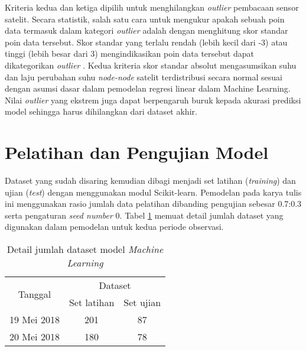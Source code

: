 Kriteria kedua dan ketiga dipilih untuk menghilangkan \textit{outlier}
pembacaan sensor satelit. Secara statistik, salah satu cara untuk mengukur
apakah sebuah poin data termasuk dalam kategori \textit{outlier} adalah dengan
menghitung skor standar poin data tersebut. Skor standar yang terlalu rendah
(lebih kecil dari -3) atau tinggi (lebih besar dari 3) mengindikasikan poin
data tersebut dapat dikategorikan \textit{outlier} \cite{boschetti2015}. Kedua
kriteria skor standar absolut mengasumsikan suhu dan laju perubahan suhu
\textit{node-node} satelit terdistribusi secara normal sesuai dengan asumsi
dasar dalam pemodelan regresi linear dalam Machine Learning. Nilai
\textit{outlier} yang ekstrem juga dapat berpengaruh buruk kepada akurasi
prediksi model sehingga harus dihilangkan dari dataset akhir.

\section{Pelatihan dan Pengujian Model}

Dataset yang sudah disaring kemudian dibagi menjadi set latihan
(\textit{training}) dan ujian (\textit{test}) dengan menggunakan modul
Scikit-learn. Pemodelan pada karya tulis ini menggunakan rasio jumlah data
pelatihan dibanding pengujian sebesar 0.7:0.3 serta pengaturan \textit{seed
number} 0. Tabel \ref{table:dataset} memuat detail jumlah dataset yang digunakan dalam pemodelan
untuk kedua periode observasi.

\begin{table}[!ht]
\begin{center}
\caption{Detail jumlah dataset model \textit{Machine Learning}}
\label{table:dataset}
\begin{tabular}{|c|cc|}
\hline
\multirow{2}{*}{Tanggal} & \multicolumn{2}{c|}{Dataset}                 \\ \cline{2-3} 
                         & \multicolumn{1}{c|}{Set latihan} & Set ujian \\ \hline
19 Mei 2018              & \multicolumn{1}{c|}{201}         & 87        \\ \hline
20 Mei 2018              & \multicolumn{1}{c|}{180}         & 78        \\ \hline
\end{tabular}
\end{center}
\vspace{-5mm}
\end{table}
